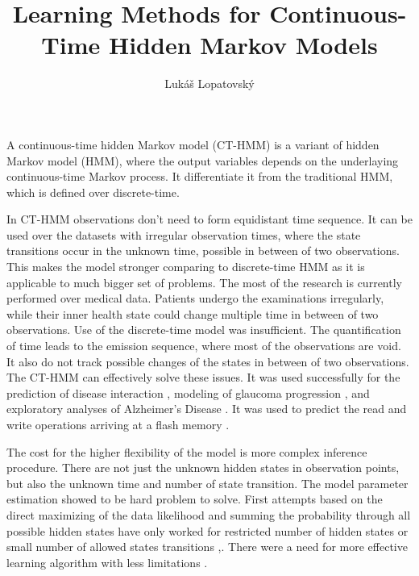 \documentclass[thesis=M,english]{FITthesis}[2012/10/20]
\title{Learning Methods for Continuous-Time Hidden Markov Models}
\author{Luk{\' a}{\v s} Lopatovsk{\' y}} %
\begin{document}


\begin{introduction}

A continuous-time hidden Markov model (CT-HMM) is a variant of hidden Markov model (HMM), where the output variables depends on the underlaying continuous-time Markov process. It differentiate it from the traditional HMM, which is defined over discrete-time. 

In CT-HMM observations don't need to form equidistant time sequence. It can be used over the datasets with irregular observation times, where the state transitions occur in the unknown time, possible in between of two observations. This makes the model stronger comparing to discrete-time HMM as it is applicable to much bigger set of problems. The most of the research is currently performed over medical data. Patients undergo the examinations irregularly, while their inner health state could change multiple time in between of two observations. Use of the discrete-time model was insufficient. The quantification of time leads to the emission sequence, where most of the observations are void. It also do not track possible changes of the states in between of two observations. The CT-HMM can effectively solve these issues. It was used successfully for the prediction of disease interaction \cite{Le11}, modeling of glaucoma progression \cite{Li13} \cite{Li15}, and exploratory analyses of Alzheimer's Disease \cite{Li15}. It was used to predict the read and write operations arriving at a flash memory \cite{Zr10}.      

The cost for the higher flexibility of the model is more complex inference procedure. There are not just the unknown hidden states in observation points, but also the unknown time and number of state transition. The model parameter estimation showed to be hard problem to solve. First attempts based on the direct maximizing of the data likelihood and summing the probability through all possible hidden states have only worked for restricted number of hidden states or small number of allowed states transitions \cite{Zr10},\cite{Ja11}. There were a need for more effective learning algorithm with less limitations \cite{Li13}.    


\end{introduction}
\end{document}
